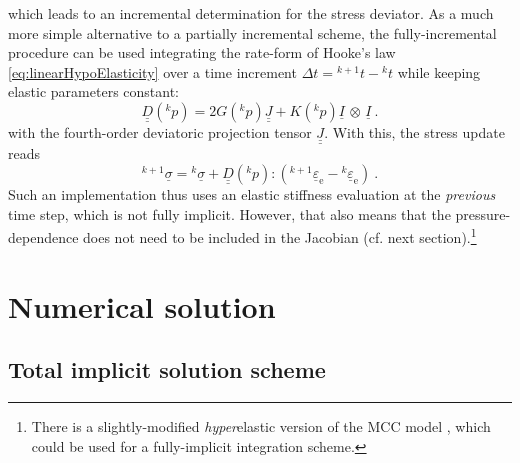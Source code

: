 \documentclass[paper=a4, twoside, pagesize]{scrartcl}
\newcommand{\tensor}[1]{\underline{#1}}
\newcommand{\tensorf}[1]{\underline{\underline{#1}}}
\newcommand{\e}{\text{e}}
\newcommand{\dyad}{\,\otimes\,}
\begin{document}
which leads to an incremental determination for the stress deviator. As a much more simple alternative to a partially incremental scheme, the fully-incremental procedure can be used integrating the rate-form of Hooke's law \eqref{eq:linearHypoElasticity} over a time increment $\varDelta t = {}^{k+1}t - {}^{k}t$ while keeping elastic parameters constant:
\begin{equation}\label{eq:elasticityTensorFromPreviousPressure}
  \tensorf D({}^{k}p) = 2G({}^{k}p) \tensorf J + K({}^{k}p) \tensor I\dyad\tensor I \ .
\end{equation}
with the fourth-order deviatoric projection tensor $\tensorf J$. With this, the stress update reads
\begin{equation}
  ^{k+1}\tensor\sigma = {}^{k}\tensor\sigma + \tensorf D({}^{k}p) : \left({}^{k+1}\tensor\varepsilon_\e - {}^{k}\tensor\varepsilon_\e \right) \ .    
\end{equation}
Such an implementation thus uses an elastic stiffness evaluation at the \emph{previous} time step, which is not fully implicit. However, that also means that the pressure-dependence does not need to be included in the Jacobian (cf. next section).\footnote{There is a slightly-modified \emph{hyper}elastic version of the MCC model \cite{Houlsby1985}, which could be used for a fully-implicit integration scheme.}

\section{Numerical solution}

\subsection{Total implicit solution scheme}
\end{document}

